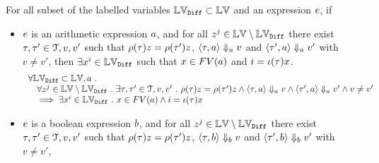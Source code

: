 \begin{lem}
	\label{lem:inv_expr_gnl}
	For all subset of the labelled variables $\mathbb{LV}_{\mathtt{Diff}} \subset \mathbb{LV}$
	and an expression $e$, if 
	\begin{itemize}
		\item $e$ is an arithmetic expression $a$,
		and for all $z^j \in \mathbb{LV} \setminus \mathbb{LV}_{\mathtt{Diff}}$ 
		there exist $\mathtt{\tau}, \mathtt{\tau}' \in \mathcal{T}, v, v'$ such that 
		$\rho(\mathtt{\tau}) z = \rho(\mathtt{\tau}') z$,
		$\langle \mathtt{\tau}, a \rangle \Downarrow_a v$ and 
		$\langle \mathtt{\tau}', a \rangle \Downarrow_a v'$ with $v \neq v'$,
		then $\exists x^i \in \mathbb{LV}_{\mathtt{Diff}} $ 
		such that $x \in FV(a)$ and $i = \iota(\mathtt{\tau}) x$.
		\[
			\begin{array}{l}
			\forall \mathbb{LV}_{\mathtt{Diff}}  \subset \mathbb{LV},  
			a ~.~
			\\ \quad
			\forall z^j \in \mathbb{LV} \setminus \mathbb{LV}_{\mathtt{Diff}} ~.~ 
			\exists \mathtt{\tau}, \mathtt{\tau}' \in \mathcal{T}, v, v' ~.~ 
			\rho(\mathtt{\tau}) z = \rho(\mathtt{\tau}') z 
			\land 
			\langle \mathtt{\tau}, a \rangle \Downarrow_a v 
			\land \langle \mathtt{\tau}', a \rangle \Downarrow_a v' \land v \neq v'
			\\ \quad
			\implies \exists x^i \in \mathbb{LV}_{\mathtt{Diff}} ~.~ 
			x \in FV(a) \land i = \iota(\mathtt{\tau}) x
			\end{array}
		\]
	\item $e$ is a boolean expression $b$,
	and for all $z^j \in \mathbb{LV} \setminus \mathbb{LV}_{\mathtt{Diff}}$ 
	there exist $\mathtt{\tau}, \mathtt{\tau}' \in \mathcal{T}, v, v'$ such that 
	$\rho(\mathtt{\tau}) z = \rho(\mathtt{\tau}') z$,
	$\langle \mathtt{\tau}, b \rangle \Downarrow_b v$ and 
	$\langle \mathtt{\tau}', b \rangle \Downarrow_b v'$ with $v \neq v'$,

\end{itemize}
\end{lem}
